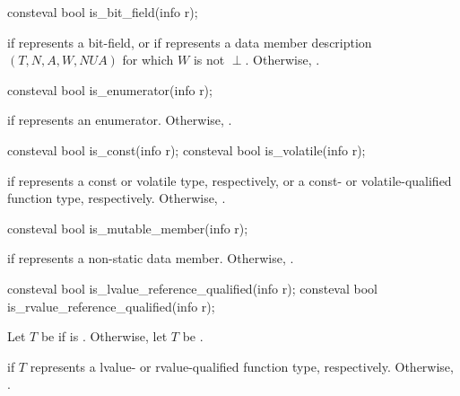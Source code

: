 %
\begin{itemdecl}
consteval bool is_bit_field(info r);
\end{itemdecl}

\begin{itemdescr}
\pnum
\returns
{} if  represents a bit-field,
or if  represents a data member description
$(T, N, A, W, \mathit{NUA})$
for which $W$ is not $\perp$.
Otherwise, .
\end{itemdescr}

%
\begin{itemdecl}
consteval bool is_enumerator(info r);
\end{itemdecl}

\begin{itemdescr}
\pnum
\returns
{} if  represents an enumerator.
Otherwise, .
\end{itemdescr}

%
%
\begin{itemdecl}
consteval bool is_const(info r);
consteval bool is_volatile(info r);
\end{itemdecl}

\begin{itemdescr}
\pnum
\returns
{} if  represents a const or volatile type, respectively,
or a const- or volatile-qualified function type, respectively.
Otherwise, .
\end{itemdescr}

%
\begin{itemdecl}
consteval bool is_mutable_member(info r);
\end{itemdecl}

\begin{itemdescr}
\pnum
\returns
{} if  represents a  non-static data member.
Otherwise, .
\end{itemdescr}

%
%
\begin{itemdecl}
consteval bool is_lvalue_reference_qualified(info r);
consteval bool is_rvalue_reference_qualified(info r);
\end{itemdecl}

\begin{itemdescr}
\pnum
Let $T$ be  if  is .
Otherwise, let $T$ be .

\pnum
\returns
{} if $T$ represents a
lvalue- or rvalue-qualified function type, respectively.
Otherwise, .
\end{itemdescr}

